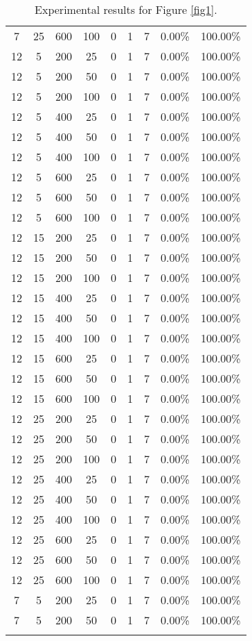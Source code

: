 \documentclass[11pt]{article}
\begin{document}
\begin{center}
{\begin{longtable}{| c | c | c | c | c | c | c | c | c |}
 7 & 25 & 600 & 100 & 0 & 1 & 7 & 0.00\% & 100.00\%   \\
 12 & 5 & 200 & 25 & 0 & 1 & 7 & 0.00\% & 100.00\%   \\
 12 & 5 & 200 & 50 & 0 & 1 & 7 & 0.00\% & 100.00\%   \\
 12 & 5 & 200 & 100 & 0 & 1 & 7 & 0.00\% & 100.00\%   \\
 12 & 5 & 400 & 25 & 0 & 1 & 7 & 0.00\% & 100.00\%   \\
 12 & 5 & 400 & 50 & 0 & 1 & 7 & 0.00\% & 100.00\%   \\
 12 & 5 & 400 & 100 & 0 & 1 & 7 & 0.00\% & 100.00\%   \\
 12 & 5 & 600 & 25 & 0 & 1 & 7 & 0.00\% & 100.00\%   \\
 12 & 5 & 600 & 50 & 0 & 1 & 7 & 0.00\% & 100.00\%   \\
 12 & 5 & 600 & 100 & 0 & 1 & 7 & 0.00\% & 100.00\%   \\
 12 & 15 & 200 & 25 & 0 & 1 & 7 & 0.00\% & 100.00\%   \\
 12 & 15 & 200 & 50 & 0 & 1 & 7 & 0.00\% & 100.00\%   \\
 12 & 15 & 200 & 100 & 0 & 1 & 7 & 0.00\% & 100.00\%   \\
 12 & 15 & 400 & 25 & 0 & 1 & 7 & 0.00\% & 100.00\%   \\
 12 & 15 & 400 & 50 & 0 & 1 & 7 & 0.00\% & 100.00\%   \\
 12 & 15 & 400 & 100 & 0 & 1 & 7 & 0.00\% & 100.00\%   \\
 12 & 15 & 600 & 25 & 0 & 1 & 7 & 0.00\% & 100.00\%   \\
 12 & 15 & 600 & 50 & 0 & 1 & 7 & 0.00\% & 100.00\%   \\
 12 & 15 & 600 & 100 & 0 & 1 & 7 & 0.00\% & 100.00\%   \\
 12 & 25 & 200 & 25 & 0 & 1 & 7 & 0.00\% & 100.00\%   \\
 12 & 25 & 200 & 50 & 0 & 1 & 7 & 0.00\% & 100.00\%   \\
 12 & 25 & 200 & 100 & 0 & 1 & 7 & 0.00\% & 100.00\%   \\
 12 & 25 & 400 & 25 & 0 & 1 & 7 & 0.00\% & 100.00\%   \\
 12 & 25 & 400 & 50 & 0 & 1 & 7 & 0.00\% & 100.00\%   \\
 12 & 25 & 400 & 100 & 0 & 1 & 7 & 0.00\% & 100.00\%   \\
 12 & 25 & 600 & 25 & 0 & 1 & 7 & 0.00\% & 100.00\%   \\
 12 & 25 & 600 & 50 & 0 & 1 & 7 & 0.00\% & 100.00\%   \\
 12 & 25 & 600 & 100 & 0 & 1 & 7 & 0.00\% & 100.00\%   \\
 7 & 5 & 200 & 25 & 0 & 1 & 7 & 0.00\% & 100.00\%   \\
 7 & 5 & 200 & 50 & 0 & 1 & 7 & 0.00\% & 100.00\%   \\ \hline 
\caption{Experimental results for Figure \ref{fig1}.}
\label{tbl1}
\end{longtable}
}
\end{center}
\end{document}
